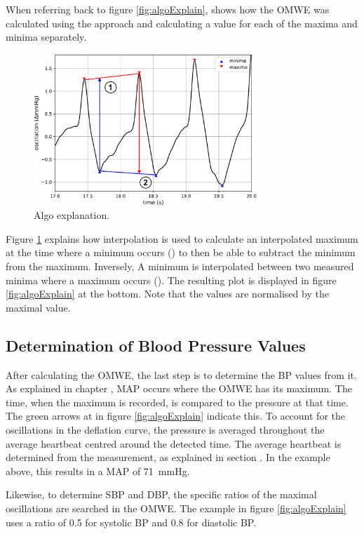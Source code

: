 When referring back to figure \ref{fig:algoExplain},  shows how the OMWE was calculated using the approach and calculating a value for each of the maxima and minima separately. 



\begin{figure}[ht]
\centering
\includegraphics[width=0.75\textwidth]{figures/omwe_exp.pdf}
\caption{Algo explanation.}
\label{fig:interpol}
\end{figure}


Figure \ref{fig:interpol} explains how interpolation is used to calculate an interpolated maximum at the time where a minimum occurs () to then be able to subtract the minimum from the maximum. Inversely, A minimum is interpolated between two measured minima where a maximum occurs (). The resulting plot is displayed in figure \ref{fig:algoExplain} at the bottom. Note that the values are normalised by the maximal value.


\subsection{Determination of Blood Pressure Values}
After calculating the OMWE, the last step is to determine the BP values from it. As explained in chapter , MAP occurs where the OMWE has its maximum. The time, when the maximum is recorded, is compared to the pressure at that time. The green arrows at  in figure \ref{fig:algoExplain} indicate this. To account for the oscillations in the deflation curve, the pressure is averaged throughout the average heartbeat centred around the detected time. The average heartbeat is determined from the measurement, as explained in section . In the example above, this results in a MAP of \SI{71}{\mmHg}.


Likewise, to determine SBP and DBP, the specific ratios of the maximal oscillations are searched in the OMWE. The example in figure \ref{fig:algoExplain} uses a ratio of 0.5 for systolic BP and 0.8 for diastolic BP.

